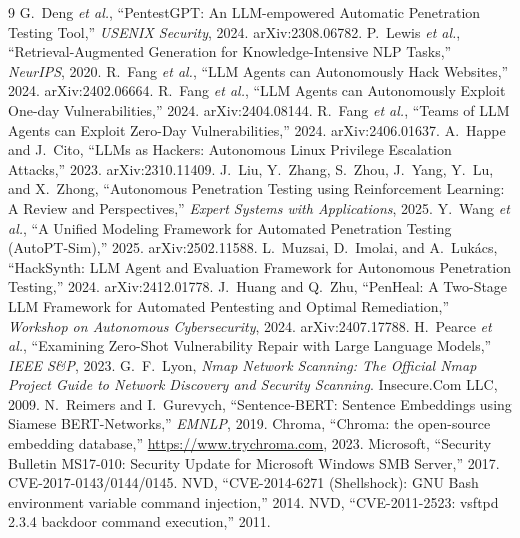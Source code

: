 \documentclass[conference]{IEEEtran}
\begin{document}
\begin{thebibliography}{9}
 G.~Deng \emph{et al.}, ``PentestGPT: An LLM-empowered
Automatic Penetration Testing Tool,'' \emph{USENIX Security}, 2024.
arXiv:2308.06782.
 P.~Lewis \emph{et al.}, ``Retrieval-Augmented Generation for
Knowledge-Intensive NLP Tasks,'' \emph{NeurIPS}, 2020.
 R.~Fang \emph{et al.}, ``LLM Agents can Autonomously Hack
Websites,'' 2024. arXiv:2402.06664.
 R.~Fang \emph{et al.}, ``LLM Agents can Autonomously Exploit
One-day Vulnerabilities,'' 2024. arXiv:2404.08144.
 R.~Fang \emph{et al.}, ``Teams of LLM Agents can Exploit
Zero-Day Vulnerabilities,'' 2024. arXiv:2406.01637.
 A.~Happe and J.~Cito, ``LLMs as Hackers: Autonomous Linux
Privilege Escalation Attacks,'' 2023. arXiv:2310.11409.
 J.~Liu, Y.~Zhang, S.~Zhou, J.~Yang, Y.~Lu, and X.~Zhong,
``Autonomous Penetration Testing using Reinforcement Learning: A Review and
Perspectives,'' \emph{Expert Systems with Applications}, 2025.
 Y.~Wang \emph{et al.}, ``A Unified Modeling Framework for
Automated Penetration Testing (AutoPT-Sim),'' 2025. arXiv:2502.11588.
 L.~Muzsai, D.~Imolai, and A.~Luk\'acs, ``HackSynth: LLM Agent
and Evaluation Framework for Autonomous Penetration Testing,'' 2024. arXiv:2412.01778.
 J.~Huang and Q.~Zhu, ``PenHeal: A Two-Stage LLM Framework for
Automated Pentesting and Optimal Remediation,'' \emph{Workshop on Autonomous
Cybersecurity}, 2024. arXiv:2407.17788.
 H.~Pearce \emph{et al.}, ``Examining Zero-Shot Vulnerability
Repair with Large Language Models,'' \emph{IEEE S\&P}, 2023.
 G.~F.~Lyon, \emph{Nmap Network Scanning: The Official Nmap Project
Guide to Network Discovery and Security Scanning}. Insecure.Com LLC, 2009.
 N.~Reimers and I.~Gurevych, ``Sentence-BERT: Sentence Embeddings
using Siamese BERT-Networks,'' \emph{EMNLP}, 2019.
 Chroma, ``Chroma: the open-source embedding database,''
\url{https://www.trychroma.com}, 2023.
 Microsoft, ``Security Bulletin MS17-010: Security Update for
Microsoft Windows SMB Server,'' 2017. CVE-2017-0143/0144/0145.
 NVD, ``CVE-2014-6271 (Shellshock): GNU Bash environment
variable command injection,'' 2014.
 NVD, ``CVE-2011-2523: vsftpd 2.3.4 backdoor command execution,''
2011.
\end{thebibliography}
\end{document}
